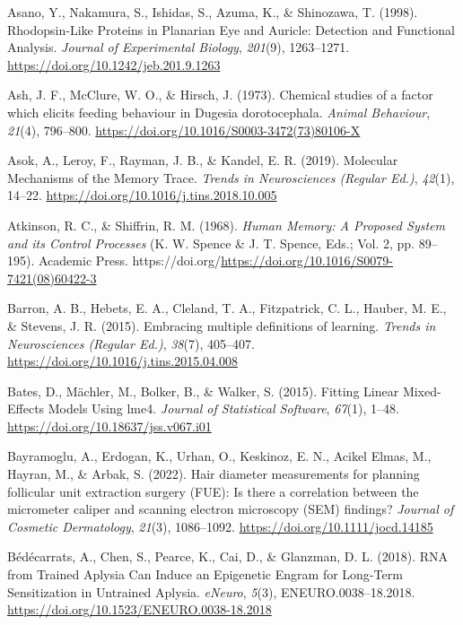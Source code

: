 \documentclass[
  jou,
  floatsintext,
  longtable,
  nolmodern,
  notxfonts,
  notimes,
  donotrepeattitle,
  colorlinks=true,linkcolor=blue,citecolor=blue,urlcolor=blue]{apa7}
\newlength{\cslhangindent}
\newenvironment{CSLReferences}[2] %
 {\begin{list}{}{%
  \setlength{\itemindent}{0pt}
  \setlength{\leftmargin}{0pt}
  \setlength{\parsep}{0pt}
  \ifodd #1
   \setlength{\leftmargin}{\cslhangindent}
   \setlength{\itemindent}{-1\cslhangindent}
  \fi
  \setlength{\itemsep}{#2\baselineskip}}}
 {\end{list}}
\begin{document}
\begin{CSLReferences}{1}{0}
Asano, Y., Nakamura, S., Ishidas, S., Azuma, K., \& Shinozawa, T.
(1998). Rhodopsin-{Like} {Proteins} in {Planarian} {Eye} and {Auricle}:
{Detection} and {Functional} {Analysis}. \emph{Journal of Experimental
Biology}, \emph{201}(9), 1263--1271.
\url{https://doi.org/10.1242/jeb.201.9.1263}

Ash, J. F., McClure, W. O., \& Hirsch, J. (1973). Chemical studies of a
factor which elicits feeding behaviour in {Dugesia} dorotocephala.
\emph{Animal Behaviour}, \emph{21}(4), 796--800.
\url{https://doi.org/10.1016/S0003-3472(73)80106-X}

Asok, A., Leroy, F., Rayman, J. B., \& Kandel, E. R. (2019). Molecular
{Mechanisms} of the {Memory} {Trace}. \emph{Trends in Neurosciences
(Regular Ed.)}, \emph{42}(1), 14--22.
\url{https://doi.org/10.1016/j.tins.2018.10.005}

Atkinson, R. C., \& Shiffrin, R. M. (1968). \emph{Human {Memory}: {A}
{Proposed} {System} and its {Control} {Processes}} (K. W. Spence \& J.
T. Spence, Eds.; Vol. 2, pp. 89--195). Academic Press.
https://doi.org/\url{https://doi.org/10.1016/S0079-7421(08)60422-3}

Barron, A. B., Hebets, E. A., Cleland, T. A., Fitzpatrick, C. L.,
Hauber, M. E., \& Stevens, J. R. (2015). Embracing multiple definitions
of learning. \emph{Trends in Neurosciences (Regular Ed.)}, \emph{38}(7),
405--407. \url{https://doi.org/10.1016/j.tins.2015.04.008}

Bates, D., Mächler, M., Bolker, B., \& Walker, S. (2015). Fitting
{Linear} {Mixed}-{Effects} {Models} {Using} lme4. \emph{Journal of
Statistical Software}, \emph{67}(1), 1--48.
\url{https://doi.org/10.18637/jss.v067.i01}

Bayramoglu, A., Erdogan, K., Urhan, O., Keskinoz, E. N., Acikel Elmas,
M., Hayran, M., \& Arbak, S. (2022). Hair diameter measurements for
planning follicular unit extraction surgery ({FUE}): {Is} there a
correlation between the micrometer caliper and scanning electron
microscopy ({SEM}) findings? \emph{Journal of Cosmetic Dermatology},
\emph{21}(3), 1086--1092. \url{https://doi.org/10.1111/jocd.14185}

Bédécarrats, A., Chen, S., Pearce, K., Cai, D., \& Glanzman, D. L.
(2018). {RNA} from {Trained} {Aplysia} {Can} {Induce} an {Epigenetic}
{Engram} for {Long}-{Term} {Sensitization} in {Untrained} {Aplysia}.
\emph{eNeuro}, \emph{5}(3), ENEURO.0038--18.2018.
\url{https://doi.org/10.1523/ENEURO.0038-18.2018}


\end{CSLReferences}
\end{document}
